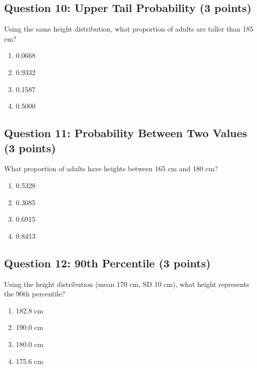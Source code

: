 \documentclass[11pt]{article}
\begin{document}
\vspace{0.5cm}

\subsection*{Question 10: Upper Tail Probability (3 points)}

Using the same height distribution, what proportion of adults are taller than 185 cm?

\begin{enumerate}[label=\Alph*)]
\item 0.0668
\item 0.9332
\item 0.1587
\item 0.5000
\end{enumerate}

\vspace{0.5cm}

\subsection*{Question 11: Probability Between Two Values (3 points)}

What proportion of adults have heights between 165 cm and 180 cm?

\begin{enumerate}[label=\Alph*)]
\item 0.5328
\item 0.3085
\item 0.6915
\item 0.8413
\end{enumerate}

\vspace{0.5cm}

\subsection*{Question 12: 90th Percentile (3 points)}

Using the height distribution (mean 170 cm, SD 10 cm), what height represents the 90th percentile?

\begin{enumerate}[label=\Alph*)]
\item 182.8 cm
\item 190.0 cm
\item 180.0 cm
\item 175.6 cm
\end{enumerate}
\end{document}
